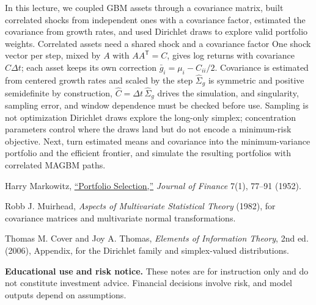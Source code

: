 \documentclass[11pt]{article}
\begin{document}
\newpage
\thispagestyle{fancy}
\keytakeaways
  {In this lecture, we coupled GBM assets through a covariance matrix, built correlated shocks from independent ones with a covariance factor, estimated the covariance from growth rates, and used Dirichlet draws to explore valid portfolio weights.}
  {Correlated assets need a shared shock and a covariance factor}
  {One shock vector per step, mixed by $A$ with $AA^{\mathsf T}=C$, gives log returns with covariance $C\Delta t$; each asset keeps its own correction $\bar g_i=\mu_i-C_{ii}/2$.}
  {Covariance is estimated from centered growth rates and scaled by the step}
  {$\widehat\Sigma_g$ is symmetric and positive semidefinite by construction, $\widehat C=\Delta t\,\widehat\Sigma_g$ drives the simulation, and singularity, sampling error, and window dependence must be checked before use.}
  {Sampling is not optimization}
  {Dirichlet draws explore the long-only simplex; concentration parameters control where the draws land but do not encode a minimum-risk objective.}
  {Next, turn estimated means and covariance into the minimum-variance portfolio and the efficient frontier, and simulate the resulting portfolios with correlated MAGBM paths.}

\begin{readinglist}
  \item Harry Markowitz, \href{https://www.jstor.org/stable/2975974}{``Portfolio Selection,''} \emph{Journal of Finance} 7(1), 77--91 (1952).
  \item Robb J. Muirhead, \emph{Aspects of Multivariate Statistical Theory} (1982), for covariance matrices and multivariate normal transformations.
  \item Thomas M. Cover and Joy A. Thomas, \emph{Elements of Information Theory}, 2nd ed. (2006), Appendix, for the Dirichlet family and simplex-valued distributions.
\end{readinglist}

\vfill
{\sffamily\footnotesize\color{vnmuted}\textbf{Educational use and risk notice.} These notes are for instruction only and do not constitute investment advice. Financial decisions involve risk, and model outputs depend on assumptions.}
\end{document}
